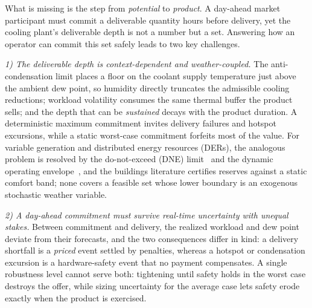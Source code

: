 What is missing is the step from \emph{potential} to \emph{product}. A
day-ahead market participant must commit a deliverable quantity hours before
delivery, yet the cooling plant's deliverable depth is not a number but a set.
Answering how an operator can commit this set safely leads to two key
challenges.

\textit{1) The deliverable depth is context-dependent and weather-coupled.}
The anti-condensation limit places a floor on the coolant supply temperature
just above the ambient dew point, so humidity directly truncates the
admissible cooling reductions; workload volatility consumes the same thermal
buffer the product sells; and the depth that can be \emph{sustained} decays
with the product duration. A deterministic maximum commitment invites
delivery failures and hotspot excursions, while a static worst-case
commitment forfeits most of the value. For variable generation and
distributed energy resources (DERs), the analogous problem is resolved by
the do-not-exceed (DNE) limit~\cite{zhao2015variable} and the dynamic
operating envelope~\cite{aemo2022doe}, and the buildings literature
certifies reserves against a static comfort band; none covers a feasible
set whose lower boundary is an exogenous stochastic weather variable.

\textit{2) A day-ahead commitment must survive real-time uncertainty with
unequal stakes.} Between commitment and delivery, the realized workload and
dew point deviate from their forecasts, and the two consequences differ in
kind: a delivery shortfall is a \emph{priced} event settled by penalties,
whereas a hotspot or condensation excursion is a hardware-safety event that no
payment compensates. A single robustness level cannot serve both: tightening
until safety holds in the worst case destroys the offer, while sizing
uncertainty for the average case lets safety erode exactly when the product
is exercised.

